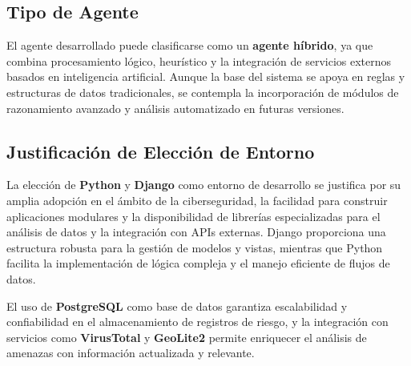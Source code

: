 \subsection{Tipo de Agente}

El agente desarrollado puede clasificarse como un \textbf{agente híbrido}, ya que combina procesamiento lógico, heurístico y la integración de servicios externos basados en inteligencia artificial. Aunque la base del sistema se apoya en reglas y estructuras de datos tradicionales, se contempla la incorporación de módulos de razonamiento avanzado y análisis automatizado en futuras versiones.

\subsection{Justificación de Elección de Entorno}

La elección de \textbf{Python} y \textbf{Django} como entorno de desarrollo se justifica por su amplia adopción en el ámbito de la ciberseguridad, la facilidad para construir aplicaciones modulares y la disponibilidad de librerías especializadas para el análisis de datos y la integración con APIs externas. Django proporciona una estructura robusta para la gestión de modelos y vistas, mientras que Python facilita la implementación de lógica compleja y el manejo eficiente de flujos de datos.


El uso de \textbf{PostgreSQL} como base de datos garantiza escalabilidad y confiabilidad en el almacenamiento de registros de riesgo, y la integración con servicios como \textbf{VirusTotal} y \textbf{GeoLite2} permite enriquecer el análisis de amenazas con información actualizada y relevante.
